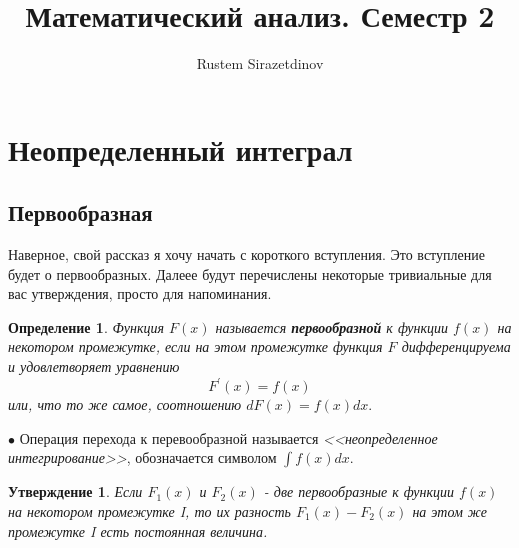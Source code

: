\documentclass[a4paper,14pt]{article} %
\title{Математический анализ. Семестр 2}
\author{Rustem Sirazetdinov}
\newtheorem{definition}{Определение}
\newtheorem{statement}{Утверждение}
\begin{document}
	
	\newpage
	\tableofcontents
	
    
    
    
    
    \newpage
    \section{Неопределенный интеграл}
    \subsection{Первообразная}
    Наверное, свой рассказ я хочу начать с короткого вступления. Это вступление будет о первообразных. Далеее будут перечислены некоторые тривиальные для вас утверждения, просто для напоминания.
    
    
    \begin{definition}
    Функция $F(x)$ называется \textbf{первообразной} к функции $f(x)$ на некотором промежутке, если на этом промежутке функция $F$ дифференцируема и удовлетворяет уравнению $$F^\prime{}(x) = f(x)$$ или, что то же самое, соотношению $dF(x) = f(x)dx.$
    \end{definition}
    
    \noindent \( \bullet \) Операция перехода к перевообразной называется \textit{<<неопределенное интегрирование>>}, обозначается символом $\int f(x)dx$.
    
    \begin{statement}\label{st:dif_of_Antiderivatives}
    Если \(F_1(x)\) и \(F_2(x)\) - две первообразные к функции $f(x)$ на некотором промежутке I, то их разность $F_1(x) - F_2(x)$ на этом же промежутке I есть постоянная величина.
    \end{statement}
    
\end{document}
